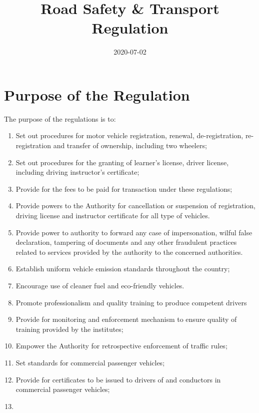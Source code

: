 \documentclass[
]{book}
\title{Road Safety \& Transport Regulation}
\author{}
\date{\vspace{-2.5em}2020-07-02}
\providecommand{\tightlist}{%
  \setlength{\itemsep}{0pt}\setlength{\parskip}{0pt}}
\begin{document}
\maketitle

{
\setcounter{tocdepth}{1}
\tableofcontents
}
\hypertarget{purpose-of-the-regulation}{%
\chapter{Purpose of the Regulation}\label{purpose-of-the-regulation}}

The purpose of the regulations is to:

\begin{enumerate}
\def\labelenumi{\alph{enumi}.}
\tightlist
\item
  Set out procedures for motor vehicle registration, renewal, de-registration, re-registration and transfer of ownership, including two wheelers;
\item
  Set out procedures for the granting of learner's license, driver license, including driving instructor's certificate;
\item
  Provide for the fees to be paid for transaction under these regulations;
\item
  Provide powers to the Authority for cancellation or suspension of registration, driving license and instructor certificate for all type of vehicles.
\item
  Provide power to authority to forward any case of impersonation, wilful false declaration, tampering of documents and any other fraudulent practices related to services provided by the authority to the concerned authorities.
\item
  Establish uniform vehicle emission standards throughout the country;
\item
  Encourage use of cleaner fuel and eco-friendly vehicles.
\item
  Promote professionalism and quality training to produce competent drivers
\item
  Provide for monitoring and enforcement mechanism to ensure quality of training provided by the institutes;
\item
  Empower the Authority for retrospective enforcement of traffic rules;
\item
  Set standards for commercial passenger vehicles;
\item
  Provide for certificates to be issued to drivers of and conductors in commercial passenger vehicles;
\item

\end{enumerate}
\end{document}
